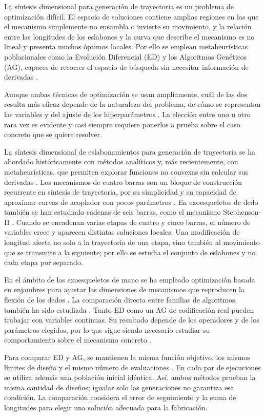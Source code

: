 \documentclass[conference,letterpaper]{IEEEtran}
\begin{document}
La síntesis dimensional para generación de trayectoria es un problema de optimización difícil. El espacio de soluciones contiene amplias regiones en las que el mecanismo simplemente no ensambla o invierte su movimiento, y la relación entre las longitudes de los eslabones y la curva que describe el mecanismo es no lineal y presenta muchos óptimos locales. Por ello se emplean metaheurísticas poblacionales como la Evolución Diferencial (ED) y los Algoritmos Genéticos (AG), capaces de recorrer el espacio de búsqueda sin necesitar información de derivadas \cite{r4,r5}.

Aunque ambas técnicas de optimización se usan ampliamente, cuál de las dos resulta más eficaz depende de la naturaleza del problema, de cómo se representan las variables y del ajuste de los hiperparámetros \cite{r6,r7}. La elección entre uno u otro rara vez es evidente y casi siempre requiere ponerlos a prueba sobre el caso concreto que se quiere resolver.

La síntesis dimensional de eslabonamientos para generación de trayectoria se ha abordado históricamente con métodos analíticos y, más recientemente, con metaheurísticas, que permiten explorar funciones no convexas sin calcular sus derivadas \cite{r4,r5}. Los mecanismos de cuatro barras son un bloque de construcción recurrente en síntesis de trayectoria, por su simplicidad y su capacidad de aproximar curvas de acoplador con pocos parámetros \cite{r4,r5}. En exoesqueletos de dedo también se han estudiado cadenas de seis barras, como el mecanismo Stephenson-II \cite{r8}. Cuando se encadenan varias etapas de cuatro y cinco barras, el número de variables crece y aparecen distintas soluciones locales. Una modificación de longitud afecta no solo a la trayectoria de una etapa, sino también al movimiento que se transmite a la siguiente; por ello se estudia el conjunto de eslabones y no cada etapa por separado.

En el ámbito de los exoesqueletos de mano se ha empleado optimización basada en enjambres para ajustar las dimensiones de mecanismos que reproducen la flexión de los dedos \cite{r8}. La comparación directa entre familias de algoritmos también ha sido estudiada \cite{r6,r7}. Tanto ED como un AG de codificación real pueden trabajar con variables continuas. Su resultado depende de los operadores y de los parámetros elegidos, por lo que sigue siendo necesario estudiar su comportamiento sobre el mecanismo concreto \cite{r9,r10}.

Para comparar ED y AG, se mantienen la misma función objetivo, los mismos límites de diseño y el mismo número de evaluaciones \cite{r6,r17}. En cada par de ejecuciones se utiliza además una población inicial idéntica. Así, ambos métodos prueban la misma cantidad de diseños; igualar solo las generaciones no garantiza esa condición. La comparación considera el error de seguimiento y la suma de longitudes para elegir una solución adecuada para la fabricación.
\end{document}
